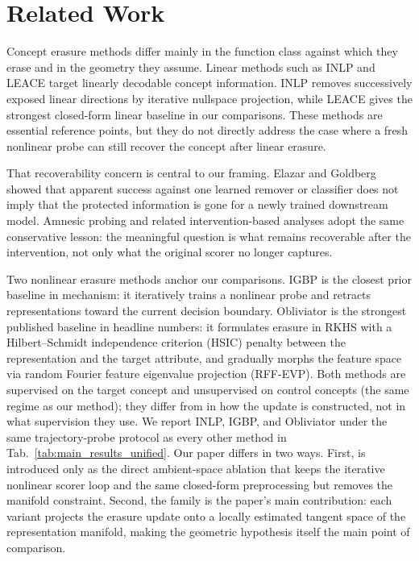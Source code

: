 \section{Related Work}
\label{sec:related}

Concept erasure methods differ mainly in the function class against which they erase and in the geometry they assume. Linear methods such as INLP \citep{ravfogel-etal-2020-null} and LEACE \citep{belrose-etal-2023-leace} target linearly decodable concept information. INLP removes successively exposed linear directions by iterative nullspace projection, while LEACE gives the strongest closed-form linear baseline in our comparisons. These methods are essential reference points, but they do not directly address the case where a fresh nonlinear probe can still recover the concept after linear erasure.

That recoverability concern is central to our framing. Elazar and Goldberg \citep{elazar-goldberg-2018-adversarial} showed that apparent success against one learned remover or classifier does not imply that the protected information is gone for a newly trained downstream model. Amnesic probing \citep{elazar-etal-2021-amnesic} and related intervention-based analyses adopt the same conservative lesson: the meaningful question is what remains recoverable after the intervention, not only what the original scorer no longer captures.

Two nonlinear erasure methods anchor our comparisons. IGBP \citep{iskander-etal-2023-shielded} is the closest prior baseline in mechanism: it iteratively trains a nonlinear probe and retracts representations toward the current decision boundary. Obliviator \citep{akbari-etal-2025-obliviator} is the strongest published baseline in headline numbers: it formulates erasure in RKHS with a Hilbert--Schmidt independence criterion (HSIC) penalty between the representation and the target attribute, and gradually morphs the feature space via random Fourier feature eigenvalue projection (RFF-EVP). Both methods are supervised on the target concept and unsupervised on control concepts (the same regime as our method); they differ from \TanGCE{} in how the update is constructed, not in what supervision they use. We report INLP, IGBP, and Obliviator under the same trajectory-probe protocol as every other method in Tab.~\ref{tab:main_results_unified}. Our paper differs in two ways. First, \AmbGCEpp{} is introduced only as the direct ambient-space ablation that keeps the iterative nonlinear scorer loop and the same closed-form preprocessing but removes the manifold constraint. Second, the \TanGCE{} family is the paper's main contribution: each variant projects the erasure update onto a locally estimated tangent space of the representation manifold, making the geometric hypothesis itself the main point of comparison.
